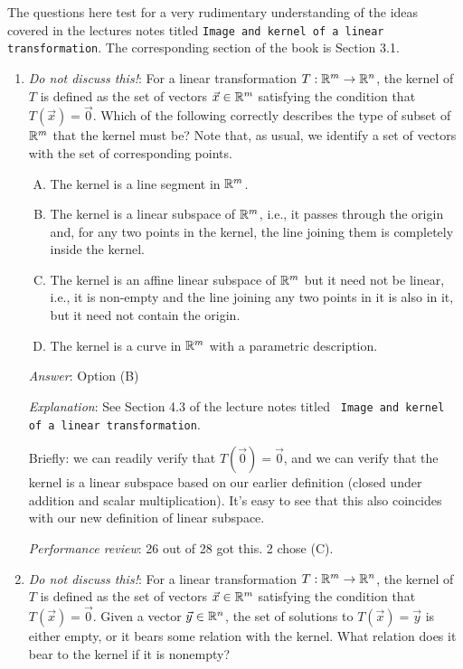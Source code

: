 \documentclass[10pt]{amsart}
\begin{document}
The questions here test for a very rudimentary understanding of the
ideas covered in the lectures notes titled {\tt Image and kernel of a
  linear transformation}. The corresponding section of the book is
Section 3.1.
\begin{enumerate}

\item {\em Do not discuss this!}: For a linear transformation $T: \mathbb{R}^m
  \to \mathbb{R}^n$, the kernel of $T$ is defined as the set of vectors
  $\vec{x} \in \mathbb{R}^m$ satisfying the condition that $T(\vec{x}) =
  \vec{0}$. Which of the following correctly describes the type of
  subset of $\mathbb{R}^m$ that the kernel must be? Note that, as usual, we
  identify a set of vectors with the set of corresponding points.

  \begin{enumerate}[(A)]
  \item The kernel is a line segment in $\mathbb{R}^m$.
  \item The kernel is a linear subspace of $\mathbb{R}^m$, i.e., it passes
    through the origin and, for any two points in the kernel, the line
    joining them is completely inside the kernel.
  \item The kernel is an affine linear subspace of $\mathbb{R}^m$ but it need
    not be linear, i.e., it is non-empty and the line joining any two
    points in it is also in it, but it need not contain the origin.
  \item The kernel is a curve in $\mathbb{R}^m$ with a parametric description.
  \end{enumerate}

  {\em Answer}: Option (B)

  {\em Explanation}: See Section 4.3 of the lecture notes titled {\tt
    Image and kernel of a linear transformation}.

  Briefly: we can readily verify that $T(\vec{0}) =
  \vec{0}$, and we can verify that the kernel is a linear subspace
  based on our earlier definition (closed under addition and scalar
  multiplication). It's easy to see that this also coincides with our
  new definition of linear subspace.

  {\em Performance review}: 26 out of 28 got this. 2 chose (C).
\item {\em Do not discuss this!}: For a linear transformation $T: \mathbb{R}^m
  \to \mathbb{R}^n$, the kernel of $T$ is defined as the set of vectors
  $\vec{x} \in \mathbb{R}^m$ satisfying the condition that $T(\vec{x}) =
  \vec{0}$. Given a vector $\vec{y} \in \mathbb{R}^n$, the set of solutions to
  $T(\vec{x}) = \vec{y}$ is either empty, or it bears some relation
  with the kernel. What relation does it bear to the kernel if it is
  nonempty?


\end{enumerate}
\end{document}
